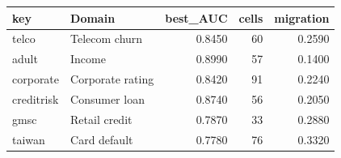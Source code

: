 \begin{tabular}{llrrr}
\toprule
key & Domain & best\_AUC & cells & migration \\
\midrule
telco & Telecom churn & 0.8450 & 60 & 0.2590 \\
adult & Income & 0.8990 & 57 & 0.1400 \\
corporate & Corporate rating & 0.8420 & 91 & 0.2240 \\
creditrisk & Consumer loan & 0.8740 & 56 & 0.2050 \\
gmsc & Retail credit & 0.7870 & 33 & 0.2880 \\
taiwan & Card default & 0.7780 & 76 & 0.3320 \\
\bottomrule
\end{tabular}
